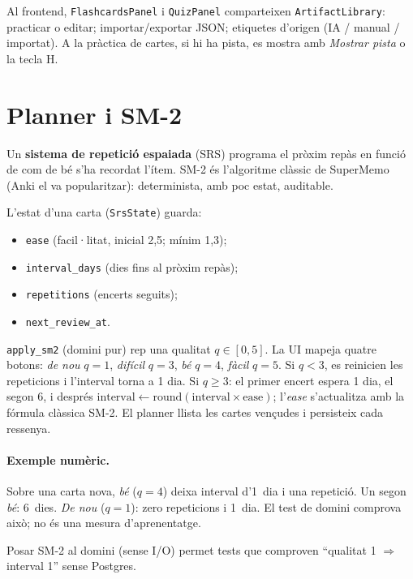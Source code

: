 Al frontend, \texttt{FlashcardsPanel} i \texttt{QuizPanel} comparteixen \texttt{ArtifactLibrary}: practicar o editar; importar/exportar JSON; etiquetes d'origen (IA / manual / importat). A la pràctica de cartes, si hi ha pista, es mostra amb \emph{Mostrar pista} o la tecla H.

\section{Planner i SM-2}

Un \textbf{sistema de repetició espaiada} (SRS) programa el pròxim repàs en funció de com de bé s'ha recordat l'ítem. SM-2 \parencite{wozniak1990supermemo} és l'algoritme clàssic de SuperMemo (Anki el va popularitzar): determinista, amb poc estat, auditable.

L'estat d'una carta (\texttt{SrsState}) guarda:

\begin{itemize}
  \item \texttt{ease} (facil·litat, inicial 2,5; mínim 1,3);
  \item \texttt{interval\_days} (dies fins al pròxim repàs);
  \item \texttt{repetitions} (encerts seguits);
  \item \texttt{next\_review\_at}.
\end{itemize}

\texttt{apply\_sm2} (domini pur) rep una qualitat $q \in [0,5]$. La UI mapeja quatre botons: \emph{de nou} $q=1$, \emph{difícil} $q=3$, \emph{bé} $q=4$, \emph{fàcil} $q=5$. Si $q<3$, es reinicien les repeticions i l'interval torna a 1 dia. Si $q\geq 3$: el primer encert espera 1 dia, el segon 6, i després $\mathrm{interval} \leftarrow \mathrm{round}(\mathrm{interval} \times \mathrm{ease})$; l'\emph{ease} s'actualitza amb la fórmula clàssica SM-2. El planner llista les cartes vençudes i persisteix cada ressenya.

\paragraph{Exemple numèric.}
Sobre una carta nova, \emph{bé} ($q=4$) deixa interval d'1~dia i una repetició. Un segon \emph{bé}: 6~dies. \emph{De nou} ($q=1$): zero repeticions i 1~dia. El test de domini comprova això; no és una mesura d'aprenentatge.

Posar SM-2 al domini (sense I/O) permet tests que comproven ``qualitat 1 $\Rightarrow$ interval 1'' sense Postgres.

